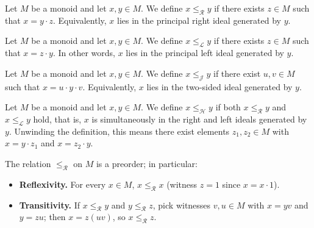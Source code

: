 
\begin{definition}
\label{def:RRel}
Let \(M\) be a monoid and let \(x,y\in M\).  We define
\(x \le_{\mathcal R} y\) if there exists \(z\in M\) such that \(x = y\cdot z\).
Equivalently, \(x\) lies in the principal right ideal generated by \(y\).
\leanok
\end{definition}

\begin{definition}
\label{def:LRel}
Let \(M\) be a monoid and let \(x,y\in M\).  We define
\(x \le_{\mathcal L} y\) if there exists \(z\in M\) such that \(x = z\cdot y\).
In other words, \(x\) lies in the principal left ideal generated by \(y\).
\leanok
\end{definition}

\begin{definition}
\label{def:JRel}
Let \(M\) be a monoid and let \(x,y\in M\).  We define
\(x \le_{\mathcal J} y\) if there exist \(u,v\in M\) such that \(x = u\cdot y\cdot v\).
Equivalently, \(x\) lies in the two‑sided ideal generated by \(y\).
\leanok
\end{definition}

\begin{definition}
\label{def:HRel}
Let \(M\) be a monoid and let \(x,y\in M\).  We define
\(x \le_{\mathcal H} y\) if both \(x \le_{\mathcal R} y\) and \(x \le_{\mathcal L} y\) hold, that is,
\(x\) is simultaneously in the right and left ideals generated by \(y\).
Unwinding the definition, this means there exist elements \(z_1,z_2\in M\)
with \(x = y\cdot z_1\) and \(x = z_2\cdot y\).
\leanok
\end{definition}

\begin{lemma}
\label{lem:RRel-preorder}
The relation \(\le_{\mathcal R}\) on \(M\) is a preorder; in particular:
\begin{itemize}
  \item \textbf{Reflexivity.} For every \(x\in M\), \(x \le_{\mathcal R} x\) (witness \(z=1\) since \(x = x\cdot 1\)).
  \item \textbf{Transitivity.} If \(x \le_{\mathcal R} y\) and \(y \le_{\mathcal R} z\), pick witnesses \(v,u\in M\) with \(x = yv\) and \(y = zu\); then \(x = z(uv)\), so \(x \le_{\mathcal R} z\).
\end{itemize}
\leanok
{}
\end{lemma}

